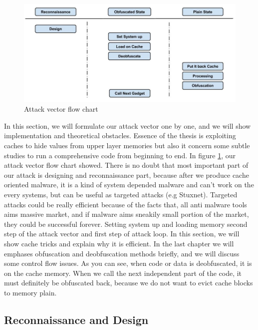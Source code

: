 	    \begin{figure}[h!]
	        \centering
	        \includegraphics[width=1\textwidth]{img/attack_vector.jpg}
	        \caption{Attack vector flow chart}
	        \label{fig:atackvector}
	    \end{figure}
	    In this section, we will formulate our attack vector one by one, and we will show implementation and theoretical obstacles. Essence of the thesis is exploiting caches to hide values from upper layer memories but also it concern some subtle studies to run a comprehensive code from beginning to end. In figure \ref{fig:atackvector}, our attack vector flow chart showed. There is no doubt that most important part of our attack is designing and reconnaissance part, because after we produce cache oriented malware, it is a kind of system depended malware and can't work on the every systems, but can be useful as targeted attacks (e.g Stuxnet). Targeted attacks could be really efficient because of the facts that, all anti malware tools aims massive market, and if malware aims sneakily small portion of the market, they could be successful forever. Setting system up and loading memory second step of the attack vector and first step of attack loop. In this section, we will show cache tricks and explain why it is efficient. In the last chapter we will emphases obfuscation and deobfuscation methods briefly, and we will discuss some control flow issues. As you can see, when code or data is deobfuscated, it is on the cache memory. When we call the next independent part of the code, it must definitely be obfuscated back, because we do not want to evict cache blocks to memory plain. 
	    \subsection{Reconnaissance and Design}

